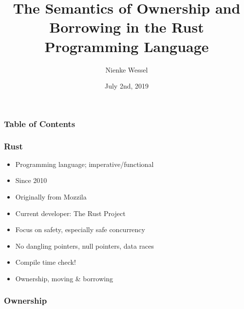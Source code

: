 \documentclass{beamer}
\title[Rust Semantics]{The Semantics of Ownership and Borrowing in the Rust Programming Language}
\author{Nienke Wessel}
\institute{Radboud University}
\date{July 2nd, 2019}
\begin{document}
 
\frame{\titlepage}



\begin{frame}
\frametitle{Table of Contents}
\tableofcontents
\end{frame}



\begin{frame}
\frametitle{Rust}
\begin{itemize}
	\item Programming language; imperative/functional
	\item Since 2010
	\item Originally from Mozzila
	\item Current developer: The Rust Project
\end{itemize}
\pause

\begin{itemize}
	\item Focus on safety, especially safe concurrency
	\item No dangling pointers, null pointers, data races
	\item Compile time check!
	\item Ownership, moving \& borrowing
\end{itemize}
\end{frame}


\begin{frame}
\frametitle{Ownership}

\end{frame}
\end{document}
